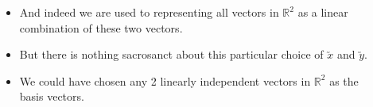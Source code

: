 \documentclass[10pt, aspectratio=169]{beamer}
\begin{document}
\begin{frame}
  \begin{columns}

    \begin{column}{0.5\textwidth}
      \centering
    \end{column}

    \begin{column}{0.5\textwidth}
      \begin{itemize}
        \item<1-> And indeed we are used to representing all vectors in $\mathbb{R}^2$ as a linear combination of these two vectors.
        
        \item<2-> But there is nothing sacrosanct about this particular choice of $\utilde{x}$ and $\utilde{y}$. 
        
        \item<3-> We could have chosen any 2 linearly independent vectors in $\mathbb{R}^2$ as the basis vectors.    
        \end{itemize}
    \end{column}

  \end{columns}
\end{frame}
\end{document}
